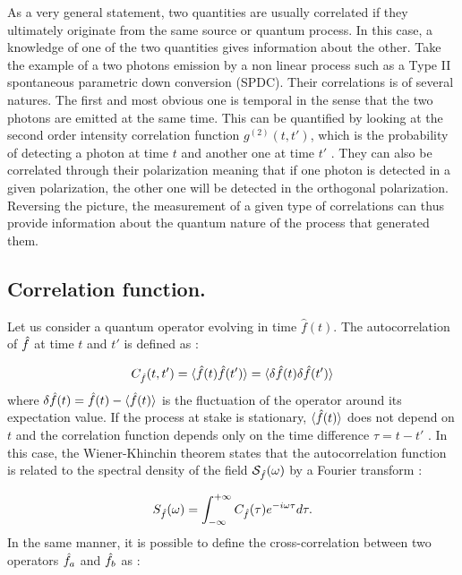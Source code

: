 \label{sec:corr_cv}
As a very general statement, two quantities are usually correlated if they ultimately originate from the same source or quantum process. In this case, a knowledge of one of the two quantities gives information about the other.
Take the example of a two photons emission by a non linear process such as a Type II spontaneous parametric down conversion (SPDC). Their correlations is of several natures. The first and most obvious one is temporal in the sense that the two photons are emitted at the same time. This can be
quantified by looking at the second order intensity correlation function $g^{(2)}(t,t')$, which is the probability of detecting a photon at time $t$ and another one at time $t'$ \cite{hanbury_brown_twiss_1956}. They can also 
be correlated through their polarization meaning that if one photon is detected in a given polarization, the other one will be detected in the orthogonal polarization. Reversing the picture,
the measurement of a given type of correlations can thus provide information about the quantum nature of the process that generated them.

\subsection{Correlation function.} Let us consider a quantum operator evolving in time $\hat{f}(t)$. The autocorrelation of $\hat{f}$ at time $t$ and $t'$ is defined as :


\begin{equation}
    \label{eq:autocorr}
    C_{\hat{f}}(t,t') = \langle \hat{f}(t)\hat{f}(t') \rangle = \langle \delta \hat{f}(t) \delta \hat{f}(t') \rangle
\end{equation}
where $\delta \hat{f}(t) = \hat{f}(t) - \langle \hat{f}(t) \rangle$ is the fluctuation of the operator around its expectation value. If the process at stake 
is stationary, $\langle \hat{f}(t) \rangle$ does not depend on $t$ and the correlation function depends only on the time difference $\tau= t-t'$ \cite{bachor_guide_1998}. In this case,
the Wiener-Khinchin theorem states that the autocorrelation function is related to the spectral density of the field $\mathcal{S}_{\hat{f}}(\omega)$ by a Fourier transform \cite{fabre_houches_97} :

\begin{equation}
    \label{eq:autocorr_spectral}
    S_{\hat{f}}(\omega) = \int_{-\infty}^{+\infty} C_{\hat{f}}(\tau) e^{-i\omega \tau} d\tau.
\end{equation}
In the same manner, it is possible to define the cross-correlation between two operators $\hat{f}_a$ and $\hat{f}_b$ as :

